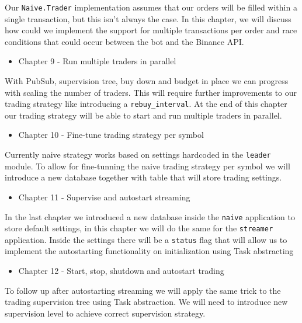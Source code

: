 \documentclass[
]{book}
\providecommand{\tightlist}{%
  \setlength{\itemsep}{0pt}\setlength{\parskip}{0pt}}
\begin{document}
Our \texttt{Naive.Trader} implementation assumes that our orders will be filled within a single transaction, but this isn't always the case. In this chapter, we will discuss how could we implement the support for multiple transactions per order and race conditions that could occur between the bot and the Binance API.

\begin{itemize}
\tightlist
\item
  Chapter 9 - Run multiple traders in parallel
\end{itemize}

With PubSub, supervision tree, buy down and budget in place we can progress with scaling the number of traders. This will require further improvements to our trading strategy like introducing a \texttt{rebuy\_interval}. At the end of this chapter our trading strategy will be able to start and run multiple traders in parallel.

\begin{itemize}
\tightlist
\item
  Chapter 10 - Fine-tune trading strategy per symbol
\end{itemize}

Currently naive strategy works based on settings hardcoded in the \texttt{leader} module. To allow for fine-tunning the naive trading strategy per symbol we will introduce a new database together with table that will store trading settings.

\begin{itemize}
\tightlist
\item
  Chapter 11 - Supervise and autostart streaming
\end{itemize}

In the last chapter we introduced a new database inside the \texttt{naive} application to store default settings, in this chapter we will do the same for the \texttt{streamer} application. Inside the settings there will be a \texttt{status} flag that will allow us to implement the autostarting functionality on initialization using Task abstracting

\begin{itemize}
\tightlist
\item
  Chapter 12 - Start, stop, shutdown and autostart trading
\end{itemize}

To follow up after autostarting streaming we will apply the same trick to the trading supervision tree using Task abstraction. We will need to introduce new supervision level to achieve correct supervision strategy.
\end{document}
